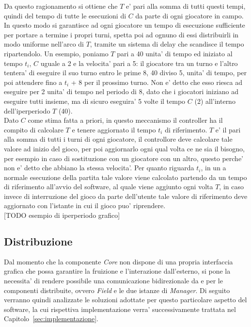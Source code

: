 Da questo ragionamento si ottiene che $T$ e' pari alla somma di tutti questi tempi, quindi del tempo di tutte le esecuzioni di $C$ da parte di ogni giocatore in campo. In questo modo si garantisce ad ogni giocatore un tempo di esecuzione sufficiente per portare a termine i propri turni, spetta poi ad ognuno di essi distribuirli in modo uniforme nell'arco di $T$, tramite un sistema di delay che scandisce il tempo ripartendolo. Un esempio, poniamo $T$ pari a 40 unita' di tempo ed iniziato al tempo $t_i$, $C$ uguale a 2 e la velocita' pari a 5: il giocatore tra un turno e l'altro tentera' di eseguire il suo turno entro le prime 8, 40 diviso 5, unita' di tempo, per poi attendere fino a $t_i$ + 8 per il prossimo turno. Non e' detto che esso riesca ad eseguire per 2 unita' di tempo nel periodo di 8, dato che i giocatori iniziano ad eseguire tutti insieme, ma di sicuro eseguira' 5 volte il tempo $C$ (2) all'interno dell'iperperiodo $T$ (40).\\

Dato $C$ come stima fatta a priori, in questo meccanismo il controller ha il compito di calcolare $T$ e tenere aggiornato il tempo $t_i$ di riferimento. $T$ e' il pari alla somma di tutti i turni di ogni giocatore, il controllore deve calcolare tale valore ad inizio del gioco, per poi aggiornarlo ogni qual volta ce ne sia il bisogno, per esempio in caso di sostituzione con un giocatore con un altro, questo perche' non e' detto che abbiano la stessa velocita'. Per quanto riguarda $t_i$, in un
a normale esecuzione della partita tale valore viene calcolato partendo da un tempo di riferimento all'avvio del software, al quale viene aggiunto ogni volta $T$, in caso invece di interruzione del gioco da parte dell'utente tale valore di riferimento deve aggiornato con l'istante in cui il gioco puo' riprendere.\\

[TODO esempio di iperperiodo grafico]

\subsection{Distribuzione}
\label{sec:analisi_distribuzione}

Dal momento che la componente \textit{Core} non dispone di una propria interfaccia grafica che possa garantire la fruizione e l'interazione dall'esterno, si pone la necessita' di rendere possibile una comunicazione bidirezionale da e per le componenti distribuite, ovvero \textit{Field} e le due istanze di \textit{Manager}. Di seguito verranno quindi analizzate le soluzioni adottate per questo particolare aspetto del software, la cui rispettiva implementazione verra' successivamente trattata nel Capitolo~\ref{sec:implementazione}.

